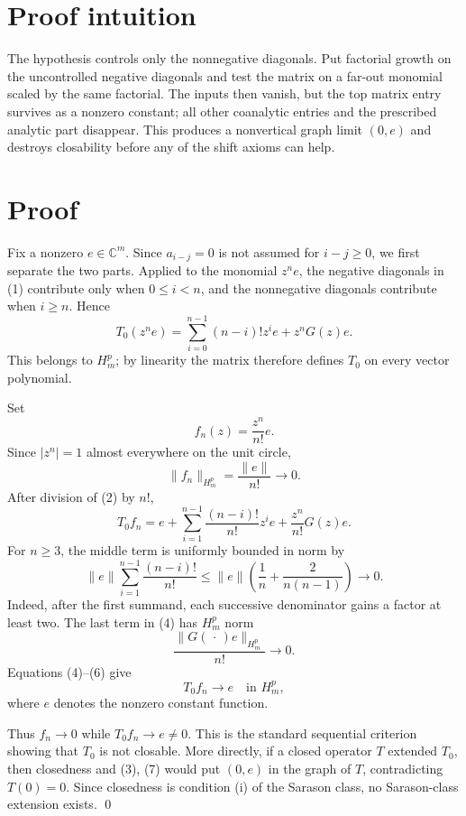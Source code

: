 \documentclass[11pt]{article}
\newcommand{\C}{\mathbb C}
\begin{document}
\section*{Proof intuition}

The hypothesis controls only the nonnegative diagonals.  Put factorial
growth on the uncontrolled negative diagonals and test the matrix on a
far-out monomial scaled by the same factorial.  The inputs then vanish, but
the top matrix entry survives as a nonzero constant; all other coanalytic
entries and the prescribed analytic part disappear.  This produces a
nonvertical graph limit $(0,e)$ and destroys closability before any of the
shift axioms can help.

\section*{Proof}

Fix a nonzero $e\in\C^m$.  Since $a_{i-j}=0$ is not assumed for
$i-j\ge0$, we first separate the two parts.  Applied to the monomial
$z^ne$, the negative diagonals in (1) contribute only when $0\le i<n$,
and the nonnegative diagonals contribute when $i\ge n$.  Hence
\[
 T_0(z^ne)
 =\sum_{i=0}^{n-1}(n-i)!z^ie+z^nG(z)e.                   \tag{2}
\]
This belongs to $H_m^p$; by linearity the matrix therefore defines $T_0$
on every vector polynomial.

Set
\[
                         f_n(z)=\frac{z^n}{n!}e.
\]
Since $\lvert z^n\rvert=1$ almost everywhere on the unit circle,
\[
                       \|f_n\|_{H_m^p}=\frac{\|e\|}{n!}\longrightarrow0.
                                                                    \tag{3}
\]
After division of (2) by $n!$,
\[
 T_0f_n
 =e+\sum_{i=1}^{n-1}\frac{(n-i)!}{n!}z^ie
   +\frac{z^n}{n!}G(z)e.                                  \tag{4}
\]
For $n\ge3$, the middle term is uniformly bounded in norm by
\[
 \|e\|\sum_{i=1}^{n-1}\frac{(n-i)!}{n!}
 \le \|e\|\left(\frac1n+\frac{2}{n(n-1)}\right)
 \longrightarrow0.                                      \tag{5}
\]
Indeed, after the first summand, each successive denominator gains a
factor at least two.  The last term in (4) has $H_m^p$ norm
\[
                 \frac{\|G(\,\cdot\,)e\|_{H_m^p}}{n!}
                 \longrightarrow0.                       \tag{6}
\]
Equations (4)--(6) give
\[
                         T_0f_n\longrightarrow e
                         \quad\text{in }H_m^p,             \tag{7}
\]
where $e$ denotes the nonzero constant function.

Thus $f_n\to0$ while $T_0f_n\to e\ne0$.  This is the standard sequential
criterion showing that $T_0$ is not closable.  More directly, if a closed
operator $T$ extended $T_0$, then closedness and (3), (7) would put
$(0,e)$ in the graph of $T$, contradicting $T(0)=0$.  Since closedness is
condition (i) of the Sarason class, no Sarason-class extension exists.
\qed
\end{document}
